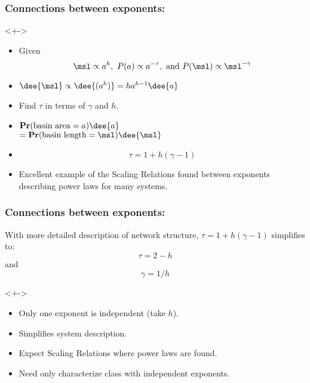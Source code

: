\begin{frame}
  \frametitle{Connections between exponents:}

  \begin{block}<+->{}
  \begin{itemize}
  \item <+->   
    Given $$ \msl \propto a^{h}, \ P(a) \propto a^{-\tau},\ \mbox{and} \  P(\msl) \propto \msl^{-\gamma}$$
  \item <+->   
    $ \dee{\msl} \propto \dee{(a^{h})} = h a^{h-1} \dee{a} $    
  \item <+->  
    Find $\tau$ in terms of $\gamma$ and $h$.
  \item <+->  
    $
    \mathbf{Pr}(\mbox{basin area} = a) \dee{a}
    $\\
    $
    =
    \mathbf{Pr}(\mbox{basin length} = \msl) \dee{\msl}
    $\\
    \uncover<+->{
    $
    \propto
    \msl^{-\gamma} \dee{\msl} 
    $\\}
    \item<+->
      $$\boxed{\tau = 1 + h(\gamma-1)} $$
    \item<+->
      Excellent example of the \alert{Scaling Relations}
      found between exponents describing power laws
      for many systems.
  \end{itemize}
  \end{block}

\end{frame}


\begin{frame}
  \frametitle{Connections between exponents:}

  \begin{block}{With more detailed description of network structure,
      $\tau = 1 + h(\gamma-1)$ simplifies to:\cite{dodds1999a}}
    $$\boxed{\tau = 2 - h}$$
    and
    $$\boxed{\gamma = 1/h}$$
  \end{block}

  \begin{block}<+->{}
    \begin{itemize}
    \item<+-> 
      Only one exponent is independent (take $h$).
    \item<+-> 
      Simplifies system description.
    \item<+-> 
      Expect Scaling Relations where power laws are found.
    \item<+->
      Need only characterize 
      class with independent exponents.
  \end{itemize}
  \end{block}

\end{frame}

